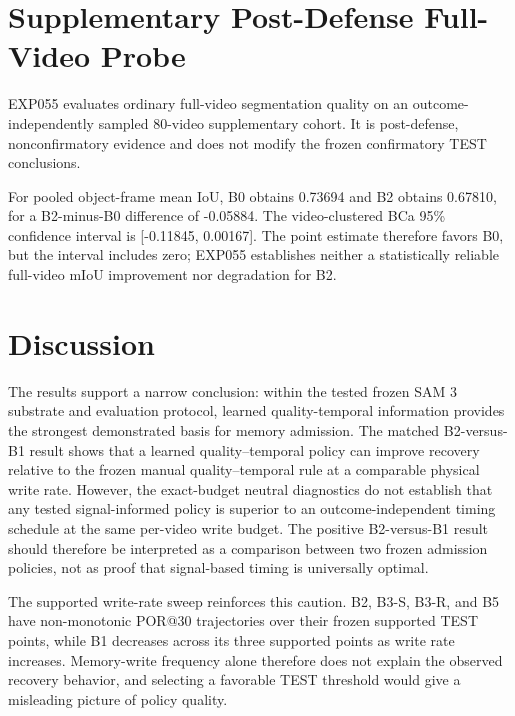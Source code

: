 \documentclass[10pt,twocolumn,letterpaper]{article}
\begin{document}
\section{Supplementary Post-Defense Full-Video Probe}
\label{sec:exp055}

EXP055 evaluates ordinary full-video segmentation quality on an
outcome-independently sampled 80-video supplementary cohort.
It is post-defense, nonconfirmatory evidence and does not modify the frozen
confirmatory TEST conclusions.

For pooled object-frame mean IoU, B0 obtains 0.73694 and B2 obtains 0.67810,
for a B2-minus-B0 difference of -0.05884.
The video-clustered BCa 95\% confidence interval is
[-0.11845, 0.00167].
The point estimate therefore favors B0, but the interval includes zero;
EXP055 establishes neither a statistically reliable full-video mIoU
improvement nor degradation for B2.


\section{Discussion}
\label{sec:discussion}

The results support a narrow conclusion:
within the tested frozen SAM 3 substrate and evaluation protocol,
learned quality-temporal information provides the strongest demonstrated
basis for memory admission.  The matched B2-versus-B1 result shows that a
learned quality--temporal policy can improve recovery relative to the frozen
manual quality--temporal rule at a comparable physical write rate.  However,
the exact-budget neutral diagnostics do not establish that any tested
signal-informed policy is superior to an outcome-independent timing schedule
at the same per-video write budget.  The positive B2-versus-B1 result should
therefore be interpreted as a comparison between two frozen admission
policies, not as proof that signal-based timing is universally optimal.

The supported write-rate sweep reinforces this caution.  B2, B3-S, B3-R,
and B5 have non-monotonic POR@30 trajectories over their frozen supported
TEST points, while B1 decreases across its three supported points as write
rate increases.  Memory-write frequency alone therefore does not explain
the observed recovery behavior, and selecting a favorable TEST threshold
would give a misleading picture of policy quality.
\end{document}
